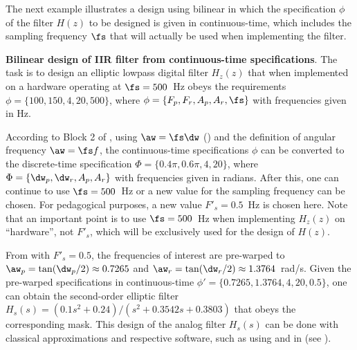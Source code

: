 


The next example illustrates a design using bilinear in which the specification $\phi$ of the filter
$H(z)$ to be designed is given in continuous-time, which includes the sampling frequency $\fs$ that will actually be used when implementing the filter.

\bExample \textbf{Bilinear design of IIR filter from continuous-time specifications}.
\label{ex:ct_bilinear_example}
The task is to design an elliptic lowpass digital filter $H_z(z)$ that when 
implemented on a hardware operating at $\fs=500$~Hz obeys the requirements
$\phi = \{100, 150, 4, 20, 500 \}$, where $\phi=\{F_p,F_r,A_p,A_r,\fs\}$ with
frequencies given in Hz.

According to Block 2 of , using $\aw=\fs \dw$ () and the definition
of angular frequency $\aw = \fs f$, the continuous-time specifications
$\phi$ can be converted to the discrete-time specification $\Phi= \{0.4 \pi, 0.6 \pi, 4, 20\}$, where $\Phi=\{\dw_p,\dw_r,A_p,A_r\}$
with frequencies given in radians.
After this, one can continue to use $\fs=500$~Hz or a new value for the sampling frequency
can be chosen. For pedagogical purposes, a new value $F'_s=0.5$~Hz is chosen here.
Note that an important point is to use $\fs=500$~Hz when implementing $H_z(z)$ on ``hardware'', not $F'_s$, which
will be exclusively used for the design of $H(z)$.

From  with $F'_s=0.5$, the frequencies of interest are pre-warped to $\aw_p=\tan(\dw_p/2) \approx 0.7265$ and $\aw_r=\tan(\dw_r/2) \approx 1.3764$~rad/s. 
Given the pre-warped specifications in continuous-time $\phi' = \{0.7265, 1.3764, 4, 20, 0.5 \}$, one can  obtain
the second-order elliptic filter $H_s(s)=(0.1s^2+0.24)/(s^2 + 0.3542s + 0.3803)$ that obeys the corresponding mask. 
This design of the analog filter $H_s(s)$ can be done with classical approximations and respective software,
such as using  and  in {\matlab} (see ).

